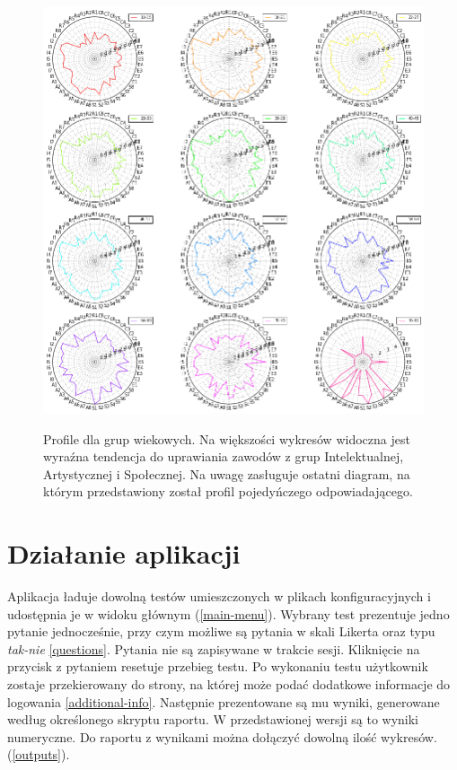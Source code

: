 \documentclass[12pt,a4paper,oneside]{report} %
\begin{document}
\begin{figure}
\centering
\includegraphics[width=1\textwidth]{profile.png}
\label{profile}
\caption{Profile dla grup wiekowych. Na większości wykresów widoczna jest wyraźna tendencja do uprawiania zawodów z grup Intelektualnej, Artystycznej i Społecznej. Na uwagę zasługuje ostatni diagram, na którym przedstawiony został profil pojedyńczego odpowiadającego.}
\end{figure}

\section{Działanie aplikacji}

Aplikacja ładuje dowolną testów umieszczonych w plikach konfiguracyjnych i udostępnia je w widoku głównym (\ref{main-menu}). Wybrany test prezentuje jedno pytanie jednocześnie, przy czym możliwe są pytania w skali Likerta oraz typu \emph{tak-nie} \ref{questions}. Pytania nie są zapisywane w trakcie sesji. Kliknięcie na przycisk z pytaniem resetuje przebieg testu.  Po wykonaniu testu użytkownik zostaje przekierowany do strony, na której może podać dodatkowe informacje do logowania \ref{additional-info}. Następnie prezentowane są mu wyniki, generowane według określonego skryptu raportu. W przedstawionej wersji są to wyniki numeryczne. Do raportu z wynikami można dołączyć dowolną ilość wykresów. (\ref{outputs}). \par
\end{document}
